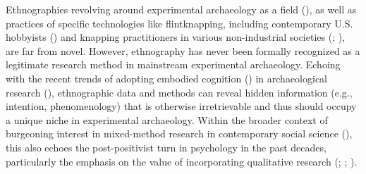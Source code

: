 \documentclass[
  11pt,
  letterpaper,
  DIV=11,
  numbers=noendperiod]{scrartcl}
\begin{document}
Ethnographies revolving around experimental archaeology as a field
(), as well as
practices of specific technologies like flintknapping, including
contemporary U.S. hobbyists () and knapping practitioners in various non-industrial societies
(;
), are far from novel. However,
ethnography has never been formally recognized as a legitimate research
method in mainstream experimental archaeology. Echoing with the recent
trends of adopting embodied cognition () in archaeological research
(), ethnographic data and
methods can reveal hidden information (e.g., intention, phenomenology)
that is otherwise irretrievable and thus should occupy a unique niche in
experimental archaeology. Within the broader context of burgeoning
interest in mixed-method research in contemporary social science
(), this also echoes
the post-positivist turn in psychology in the past decades, particularly
the emphasis on the value of incorporating qualitative research
(;
;
).
\end{document}
